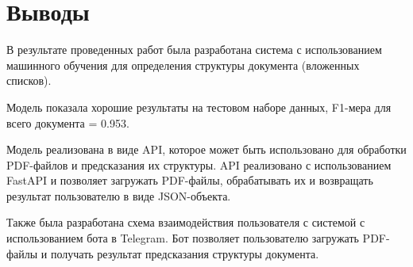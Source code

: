 \chapter{Выводы}
В результате проведенных работ была разработана система с использованием машинного обучения для определения структуры документа (вложенных списков).

Модель показала хорошие результаты на тестовом наборе данных, F1-мера для всего документа = 0.953.

Модель реализована в виде API, которое может быть использовано для обработки PDF-файлов и предсказания их структуры. API реализовано с использованием FastAPI и позволяет загружать PDF-файлы, обрабатывать их и возвращать результат пользователю в виде JSON-объекта.

Также была разработана схема взаимодействия пользователя с системой с использованием бота в Telegram. Бот позволяет пользователю загружать PDF-файлы и получать результат предсказания структуры документа.
\FloatBarrier
